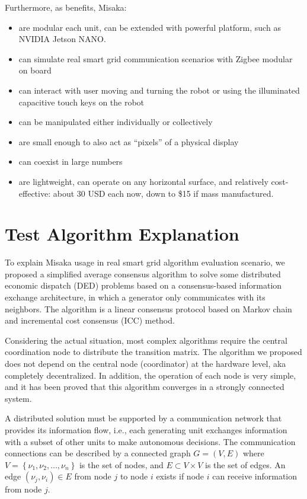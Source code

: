 \documentclass[conference]{IEEEtran}
\begin{document}
Furthermore, as benefits, Misaka:

\begin{itemize}
    \item are modular each unit, can be extended with powerful platform, such as NVIDIA Jetson NANO.
    \item can simulate real smart grid communication scenarios with Zigbee modular on board
    \item can interact with user moving and turning the robot or using the illuminated capacitive touch keys on the robot 
    \item can be manipulated either individually or collectively
    \item are small enough to also act as “pixels” of a physical display
    \item can coexist in large numbers
    \item are lightweight, can operate on any horizontal surface, and relatively cost-effective: about 30 USD each now, down to \$15 if mass manufactured.
\end{itemize}

\section{Test Algorithm Explanation}

To explain Misaka usage in real smart grid algorithm evaluation scenario, we proposed a simplified average consensus algorithm to solve some distributed economic dispatch (DED) problems based on a consensus-based information exchange architecture, in which a generator only communicates with its neighbors. The algorithm is a linear consensus protocol based on Markov chain and incremental cost consensus (ICC) method.

Considering the actual situation, most complex algorithms require the central coordination node to distribute the transition matrix. The algorithm we proposed does not depend on the central node (coordinator) at the hardware level, aka completely decentralized. In addition, the operation of each node is very simple, and it has been proved that this algorithm converges in a strongly connected system.

A distributed solution must be supported by a communication network that provides its information flow, i.e., each generating unit exchanges information with a subset of other units to make autonomous decisions\cite{binetti2013distributed}. The communication connections can be described by a connected graph $G=(V, E)$ where $V=\left\{\nu_{1}, \nu_{2}, \ldots, \nu_{n}\right\}$ is the set of nodes, and $E \subset V \times V$
is the set of edges. An edge $\left(\nu_{j}, \nu_{i}\right) \in E$ from node $j$ to node $i$ exists if node $i$ can receive information from node $j$.
\end{document}
